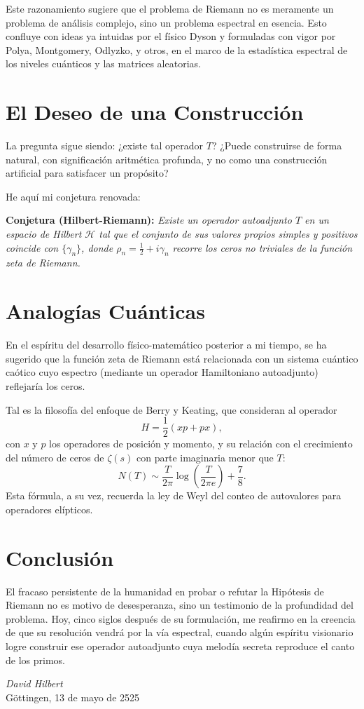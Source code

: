 \documentclass[12pt]{article}
\begin{document}
Este razonamiento sugiere que el problema de Riemann no es meramente un problema de análisis complejo, sino un problema espectral en esencia. Esto confluye con ideas ya intuidas por el físico Dyson y formuladas con vigor por Polya, Montgomery, Odlyzko, y otros, en el marco de la estadística espectral de los niveles cuánticos y las matrices aleatorias.

\section{El Deseo de una Construcción}

La pregunta sigue siendo: ¿existe tal operador $T$? ¿Puede construirse de forma natural, con significación aritmética profunda, y no como una construcción artificial para satisfacer un propósito?

He aquí mi conjetura renovada:

\medskip
\noindent\textbf{Conjetura (Hilbert-Riemann):} \textit{Existe un operador autoadjunto $T$ en un espacio de Hilbert $\mathcal{H}$ tal que el conjunto de sus valores propios simples y positivos coincide con $\{\gamma_n\}$, donde $\rho_n = \frac{1}{2} + i\gamma_n$ recorre los ceros no triviales de la función zeta de Riemann.}
\medskip

\section{Analogías Cuánticas}

En el espíritu del desarrollo físico-matemático posterior a mi tiempo, se ha sugerido que la función zeta de Riemann está relacionada con un sistema cuántico caótico cuyo espectro (mediante un operador Hamiltoniano autoadjunto) reflejaría los ceros.

Tal es la filosofía del enfoque de Berry y Keating, que consideran al operador
\[
H = \frac{1}{2}(x p + p x),
\]
con $x$ y $p$ los operadores de posición y momento, y su relación con el crecimiento del número de ceros de $\zeta(s)$ con parte imaginaria menor que $T$:
\[
N(T) \sim \frac{T}{2\pi} \log\left( \frac{T}{2\pi e} \right) + \frac{7}{8}.
\]
Esta fórmula, a su vez, recuerda la ley de Weyl del conteo de autovalores para operadores elípticos.

\section{Conclusión}

El fracaso persistente de la humanidad en probar o refutar la Hipótesis de Riemann no es motivo de desesperanza, sino un testimonio de la profundidad del problema. Hoy, cinco siglos después de su formulación, me reafirmo en la creencia de que su resolución vendrá por la vía espectral, cuando algún espíritu visionario logre construir ese operador autoadjunto cuya melodía secreta reproduce el canto de los primos.

\begin{flushright}
\textit{David Hilbert}\\
Göttingen, 13 de mayo de 2525
\end{flushright}
\end{document}
